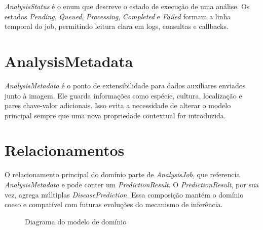 \textit{AnalysisStatus} é o enum que descreve o estado de execução de uma análise. Os estados \textit{Pending}, \textit{Queued}, \textit{Processing}, \textit{Completed} e \textit{Failed} formam a linha temporal do job, permitindo leitura clara em logs, consultas e callbacks.

\section{AnalysisMetadata}

\textit{AnalysisMetadata} é o ponto de extensibilidade para dados auxiliares enviados junto à imagem. Ele guarda informações como espécie, cultura, localização e pares chave-valor adicionais. Isso evita a necessidade de alterar o modelo principal sempre que uma nova propriedade contextual for introduzida.

\section{Relacionamentos}

O relacionamento principal do domínio parte de \textit{AnalysisJob}, que referencia \textit{AnalysisMetadata} e pode conter um \textit{PredictionResult}. O \textit{PredictionResult}, por sua vez, agrega múltiplas \textit{DiseasePrediction}. Essa composição mantém o domínio coeso e compatível com futuras evoluções do mecanismo de inferência.

\begin{figure}[H]
    \centering
    \caption{Diagrama do modelo de domínio}
    \label{fig:modelo-dominio}
\end{figure}
